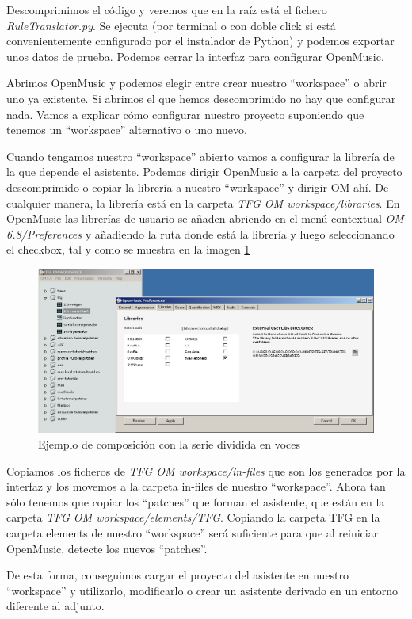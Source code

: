 \documentclass[a4paper,openany,oneside,12pt]{book}
\begin{document}
Descomprimimos el código y veremos que en la raíz está el fichero \emph{RuleTranslator.py}. Se ejecuta (por terminal o con doble click si está convenientemente configurado por el instalador de Python) y podemos exportar unos datos de prueba. Podemos cerrar la interfaz para configurar OpenMusic.

Abrimos OpenMusic y podemos elegir entre crear nuestro ``workspace'' o abrir uno ya existente. Si abrimos el que hemos descomprimido no hay que configurar nada. Vamos a explicar cómo configurar nuestro proyecto suponiendo que tenemos un ``workspace'' alternativo o uno nuevo.

Cuando tengamos nuestro ``workspace'' abierto vamos a configurar la librería de la que depende el asistente. Podemos dirigir OpenMusic a la carpeta del proyecto descomprimido o copiar la librería a nuestro ``workspace'' y dirigir OM ahí. De cualquier manera, la librería está en la carpeta \emph{TFG OM workspace/libraries}. En OpenMusic las librerías de usuario se añaden abriendo en el menú contextual \emph{OM 6.8/Preferences} y añadiendo la ruta donde está la librería y luego seleccionando el checkbox, tal y como se muestra en la imagen \ref{fig:configom}


\begin{figure}
\centering
\includegraphics[width=\textwidth]{img/configom.png}
\caption{Ejemplo de composición con la serie dividida en voces} \label{fig:configom}
\end{figure}

Copiamos los ficheros de \emph{TFG OM workspace/in-files} que son los generados por la interfaz y los movemos a la carpeta in-files de nuestro ``workspace''. Ahora tan sólo tenemos que copiar los ``patches'' que forman el asistente, que están en la carpeta \emph{TFG OM workspace/elements/TFG}. Copiando la carpeta TFG en la carpeta elements de nuestro ``workspace'' será suficiente para que al reiniciar OpenMusic, detecte los nuevos ``patches''.

De esta forma, conseguimos cargar el proyecto del asistente en nuestro ``workspace'' y utilizarlo, modificarlo o crear un asistente derivado en un entorno diferente al adjunto.
\end{document}
